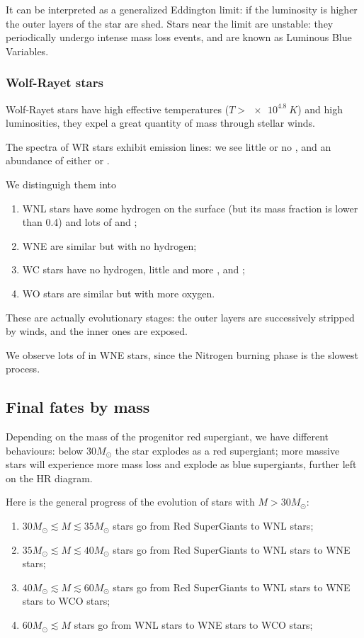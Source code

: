 \documentclass[main.tex]{subfiles}
\begin{document}
It can be interpreted as a generalized Eddington limit: if the luminosity is higher the outer layers of the star are shed.
Stars near the limit are unstable: they periodically undergo intense mass loss events, and are known as Luminous Blue Variables.

\subsubsection{Wolf-Rayet stars}

Wolf-Rayet stars have high effective temperatures (\(T > \SI{e4.8}{K}\)) and high luminosities, they expel a great quantity of mass through stellar winds. 

The spectra of WR stars exhibit emission lines: we see little or no , and an abundance of either  or .

We distinguigh them into 
\begin{enumerate}
    \item WNL stars have some hydrogen on the surface (but its mass fraction is lower than \num{.4}) and lots of  and ;
    \item WNE are similar but with no hydrogen;
    \item WC stars have no hydrogen, little  and more ,  and ;
    \item WO stars are similar but with more oxygen.
\end{enumerate}

These are actually evolutionary stages: the outer layers are successively stripped by winds, and the inner ones are exposed.

We observe lots of  in WNE stars, since the Nitrogen burning phase is the slowest process. 


\subsection{Final fates by mass}

Depending on the mass of the progenitor red supergiant, we have different behaviours: below \(30 M_{\odot} \) the star explodes as a red supergiant; more massive stars will experience more mass loss and explode as blue supergiants, further left on the HR diagram. 

Here is the general progress of the evolution of stars with \(M > 30 M_{\odot}\):
\begin{enumerate}
  \item \(30 M_{\odot} \lesssim M \lesssim 35 M_{\odot}\) stars go from Red SuperGiants to WNL stars;
  \item \(35 M_{\odot} \lesssim M \lesssim 40 M_{\odot}\) stars go from Red SuperGiants to WNL stars to WNE stars;
  \item \(40 M_{\odot} \lesssim M \lesssim 60 M_{\odot}\) stars go from Red SuperGiants to WNL stars to WNE stars to WCO stars;
  \item \(60 M_{\odot} \lesssim M \) stars go from WNL stars to WNE stars to WCO stars;
\end{enumerate}
\end{document}
